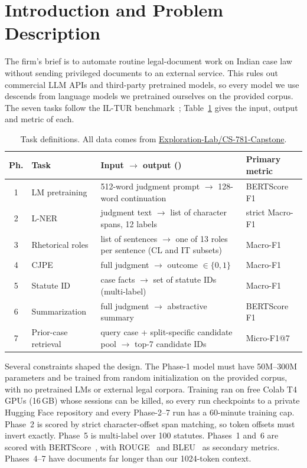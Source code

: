 \documentclass[11pt, oneside]{article}
\newcommand{\tsc}[1]{\texttt{\detokenize{#1}}}
\begin{document}
\section{Introduction and Problem Description}
The firm's brief is to automate routine legal-document work on Indian case law without sending privileged documents to an external service. This rules out commercial LLM APIs and third-party pretrained models, so every model we use descends from language models we pretrained ourselves on the provided corpus. The seven tasks follow the IL-TUR benchmark~\cite{joshi2024iltur}; Table~\ref{tab:tasks} gives the input, output and metric of each.

\begin{table}[!t]
\centering
\footnotesize
\caption{Task definitions. All data comes from \url{Exploration-Lab/CS-781-Capstone}.}
\label{tab:tasks}
\begin{tabularx}{\textwidth}{c l X l}
\toprule
Ph. & Task & Input $\rightarrow$ output (\tsc{prediction.json}) & Primary metric \\
\midrule
1 & LM pretraining & 512-word judgment prompt $\rightarrow$ 128-word continuation & BERTScore F1 \\
2 & L-NER & judgment text $\rightarrow$ list of \tsc{[start, end, label]} character spans, 12 labels & strict Macro-F1 \\
3 & Rhetorical roles & list of sentences $\rightarrow$ one of 13 roles per sentence (CL and IT subsets) & Macro-F1 \\
4 & CJPE & full judgment $\rightarrow$ outcome $\in\{0,1\}$ & Macro-F1 \\
5 & Statute ID & case facts $\rightarrow$ set of statute IDs (multi-label) & Macro-F1 \\
6 & Summarization & full judgment $\rightarrow$ abstractive summary & BERTScore F1 \\
7 & Prior-case retrieval & query case + split-specific candidate pool $\rightarrow$ top-7 candidate IDs & Micro-F1@7 \\
\bottomrule
\end{tabularx}
\end{table}

Several constraints shaped the design. The Phase-1 model must have 50M--300M parameters and be trained from random initialization on the provided corpus, with no pretrained LMs or external legal corpora. Training ran on free Colab T4 GPUs (16\,GB) whose sessions can be killed, so every run checkpoints to a private Hugging Face repository and every Phase-2--7 run has a 60-minute training cap. Phase~2 is scored by strict character-offset span matching, so token offsets must invert exactly. Phase~5 is multi-label over 100 statutes. Phases~1 and~6 are scored with BERTScore~\cite{zhang2020bertscore}, with ROUGE~\cite{lin2004rouge} and BLEU~\cite{papineni2002bleu} as secondary metrics. Phases~4--7 have documents far longer than our 1024-token context.
\end{document}
